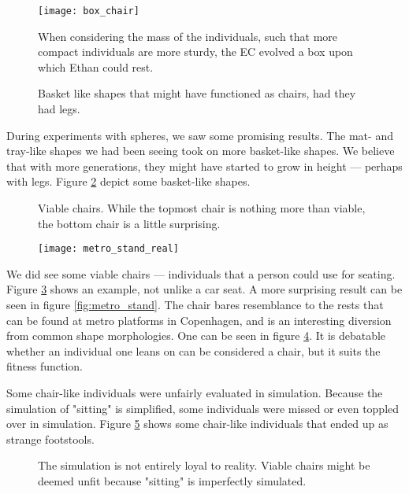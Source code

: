 \begin{figure}[ht]
	\centering
	\texttt{[image: box\_chair]}
	\caption{When considering the mass of the individuals, such that more
	compact individuals are more sturdy, the EC evolved a box upon which
	Ethan could rest.}
	\label{fig:boxchair}
\end{figure}

\begin{figure}[ht]
	\centering
	 \hfil
	\caption{Basket like shapes that might have functioned as chairs, had
	they had legs.}
	\label{fig:baskets}
\end{figure}

During experiments with spheres, we saw some promising results. The mat- and
tray-like shapes we had been seeing took on more basket-like shapes. We believe
that with more generations, they might have started to grow in height ---
perhaps with legs. Figure \ref{fig:baskets} depict some basket-like shapes.

\begin{figure}[ht]
	\centering
	 \hfil
	\caption{Viable chairs. While the topmost chair is nothing more than
	viable, the bottom chair is a little surprising.}
	\label{fig:viable_chairs}
\end{figure}

\begin{figure}[ht]
	\centering
	\texttt{[image: metro\_stand\_real]}
	\caption{}
	\label{fig:metro_stand_real}
\end{figure}

We did see some viable chairs --- individuals that a person could use for seating.
Figure \ref{fig:viable_chairs} shows an example, not unlike a car seat. A more
surprising result can be seen in figure \ref{fig:metro_stand}. The chair bares
resemblance to the rests that can be found at metro platforms in Copenhagen, and
is an interesting diversion from common shape morphologies. One can be seen in
figure \ref{fig:metro_stand_real}. It is debatable whether an individual one leans
on can be considered a chair, but it suits the fitness function.

Some chair-like individuals were unfairly evaluated in simulation. Because the
simulation of "sitting" is simplified, some individuals were missed or even
toppled over in simulation. Figure \ref{fig:footstools} shows some chair-like
individuals that ended up as strange footstools.

\begin{figure}[ht]
	\centering
	 \hfil
	\caption{The simulation is not entirely loyal to reality. Viable chairs
	might be deemed unfit because "sitting" is imperfectly simulated.}
	\label{fig:footstools}
\end{figure}
